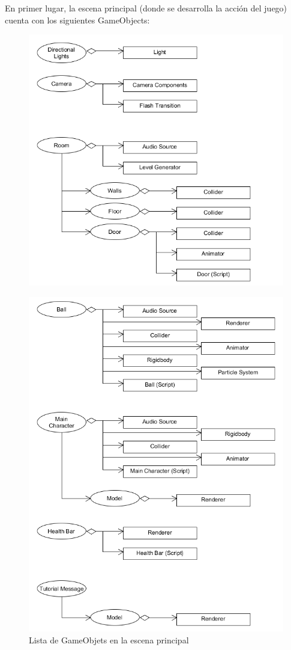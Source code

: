\clearpage 
En primer lugar, la escena principal (donde se desarrolla la acción del juego) cuenta con los siguientes GameObjects:
\begin{figure}[h]
	\includegraphics[width=1\textwidth]{images/estructura/clases/room-objects-1}
	\centering
\end{figure}
\begin{figure}[h]
	\includegraphics[width=1\textwidth]{images/estructura/clases/room-objects-2}
	\centering
	\caption{Lista de GameObjets en la escena principal}
\end{figure}

